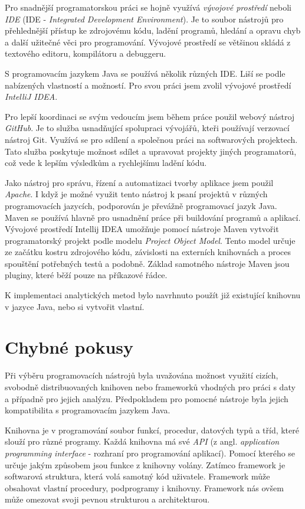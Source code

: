 \documentclass[a4paper,12pt,twoside]{scrreprt}
\begin{document}
Pro snadnější programatorskou práci se hojně využívá \textit{vývojové prostředí} neboli \textit{IDE} (IDE - \textit{Integrated Development Environment}). Je to soubor nástrojů pro přehlednější přístup ke zdrojovému kódu, ladění programů, hledání a opravu chyb a další užitečné věci pro programování. Vývojové prostředí se většinou skládá z textového editoru, kompilátoru a debuggeru. 

S programovacím jazykem Java se používá několik různých IDE. Liší se podle nabízených vlastností a možností. Pro svou práci jsem zvolil vývojové prostředí \textit{IntelliJ IDEA}. 

Pro lepší koordinaci se svým vedoucím jsem během práce použil webový nástroj \textit{GitHub}. Je to služba usnadňující spolupraci vývojářů, kteři používají verzovací nástroj Git. Využívá se pro sdílení a společnou práci na softwarových projektech. Tato služba poskytuje možnost sdílet a upravovat projekty jiných programatorů, což vede k lepším výsledkům a rychlejšímu ladění kódu. 

Jako nástroj pro správu, řízení a automatizaci tvorby aplikace jsem použil \textit{Apache}. I když je možné využit tento nástroj k psaní projektů v různých programovacích jazycích, podporován je převážně programovací jazyk Java. Maven se používá hlavně pro usnadnění práce při buildování programů a aplikací. Vývojové prostředí Intellij IDEA umožňuje pomocí nástroje Maven vytvořit programatorský projekt podle modelu \textit{Project Object Model}. Tento model určuje ze začátku kostru zdrojového kódu, závislosti na externích knihovnách a proces spouštění potřebných testů a podobně. Základ samotného nástroje Maven jsou pluginy, které běží pouze na příkazové řádce. 

K implementaci analytických metod bylo navrhnuto použít již existující knihovnu v jazyce Java, nebo si vytvořit vlastní. 

\newpage
\section{Chybné pokusy}
\vspace{0.5cm}

Při výběru programovacích nástrojů byla uvažována možnost využití cizích, svobodně distribuovaných knihoven nebo frameworků vhodných pro práci s daty a případně pro jejich analýzu. Předpokladem pro pomocné nástroje byla jejich kompatibilita s programovacím jazykem Java. 

Knihovna je v programování soubor funkcí, procedur, datových typů a tříd, které slouží pro různé programy. Každá knihovna má své \textit{API} (z angl. \textit{application programming interface} - rozhraní pro programování aplikací). Pomocí kterého se určuje jakým způsobem jsou funkce z knihovny volány. Zatímco framework je softwarová struktura, která volá samotný kód uživatele. Framework může obsahovat vlastní procedury, podprogramy i knihovny. Framework nás ovšem může omezovat svoji pevnou strukturou a architekturou. 
\end{document}
